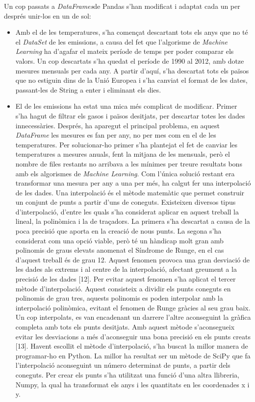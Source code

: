 \documentclass[10pt,a4paper,twocolumn,twoside]{article}
\begin{document}
Un cop passats a \textit{DataFrames}de Pandas s'han modificat i adaptat cada un per després unir-los en un de sol:
\begin{itemize}
\item Amb el de les temperatures, s'ha començat descartant tots els anys que no té el \textit{DataSet} de les emissions, a causa del fet que l'algorisme de \textit{Machine Learning} ha d'agafar el mateix període de temps per poder comparar els valors. Un cop descartats s'ha quedat el període de 1990 al 2012, amb dotze mesures mensuals per cada any. A partir d'aquí, s'ha descartat tots els països que no estiguin dins de la Unió Europea i s'ha canviat el format de les dates, passant-les de String a enter i eliminant els dies.
\item El de les emissions ha estat una mica més complicat de modificar. Primer s'ha hagut de filtrar els gasos i països desitjats, per descartar totes les dades innecessàries. Després, ha aparegut el principal problema, en aquest \textit{DataFrame} les mesures es fan per any, no per mes com en el de les temperatures. Per solucionar-ho primer s'ha plantejat el fet de canviar les temperatures a mesures anuals, fent la mitjana de les mensuals, però el nombre de files restants no arribava a les mínimes per treure resultats bons amb els algorismes de \textit{Machine Learning}. Com l'única solució restant era transformar una mesura per any a una per més, ha calgut fer una interpolació de les dades.
Una interpolació és el mètode matemàtic que permet construir un conjunt de punts a partir d'uns de coneguts. Existeixen diversos tipus d'interpolació, d'entre les quals s'ha considerat aplicar en aquest treball la lineal, la polinòmica i la de traçadors. La primera s'ha descartat a causa de la poca precisió que aporta en la creació de nous punts. La segona s'ha considerat com una opció viable, però té un hàndicap molt gran amb polinomis de graus elevats anomenat el Síndrome de Runge, en el cas d'aquest treball és de grau 12. Aquest fenomen provoca una gran desviació de les dades als extrems i al centre de la interpolació, afectant greument a la precisió de les dades [12]. Per evitar aquest fenomen s'ha aplicat el tercer mètode d'interpolació. Aquest consisteix a dividir els punts coneguts en polinomis de grau tres, aquests polinomis es poden interpolar amb la interpolació polinòmica, evitant el fenomen de Runge gràcies al seu grau baix. Un cop interpolats, es van encadenant un darrere l'altre aconseguint la gràfica completa amb tots els punts desitjats. Amb aquest mètode s'aconsegueix evitar les desviacions a més d'aconseguir una bona precisió en els punts creats [13]. Havent escollit el mètode d'interpolació, s'ha buscat la millor manera de programar-ho en Python. La millor ha resultat ser un mètode de SciPy que fa l'interpolació aconseguint un número determinat de punts, a partir dels coneguts. Per crear els punts s'ha utilitzat una funció d'una altra llibreria, Numpy, la qual ha transformat els anys i les quantitats en les coordenades x i y.
\end{itemize}
\end{document}

